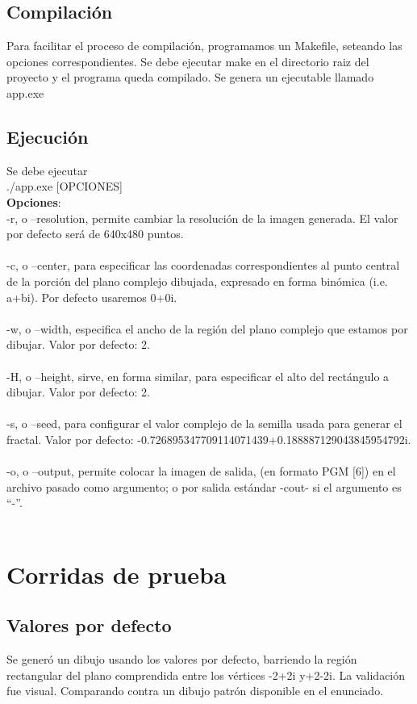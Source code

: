 \documentclass [12pt, a4paper]{article}
\begin{document}
	\subsection{Compilación}
	Para facilitar el proceso de compilación, programamos un Makefile, seteando las opciones correspondientes. Se debe ejecutar make en el directorio raiz del proyecto y el programa queda compilado. Se genera un ejecutable llamado app.exe
	\subsection{Ejecución}
	Se debe ejecutar\\
	./app.exe [OPCIONES]\\
	
	\textbf{Opciones}:\\
	-r, o --resolution, permite cambiar la resolución de la imagen generada. El valor por defecto será de 640x480 puntos.\\\\
	-c, o --center, para especificar las coordenadas correspondientes al punto central de la porción del plano complejo dibujada, expresado en forma binómica (i.e. a+bi). Por defecto usaremos 0+0i.\\\\
	-w, o --width, especifica el ancho de la región del plano complejo que estamos por dibujar. Valor por defecto: 2.\\\\
	-H, o --height, sirve, en forma similar, para especificar el alto del rectángulo a dibujar. Valor por defecto: 2.\\\\
	-s, o --seed, para configurar el valor complejo de la semilla usada para generar el fractal. Valor por defecto: -0.726895347709114071439+0.188887129043845954792i.\\\\
	-o, o --output, permite colocar la imagen de salida, (en formato PGM [6]) en el archivo pasado como argumento; o por salida estándar -cout- si el argumento es “-”.\\\\
	
	
	\section{Corridas de prueba}
	\subsection{Valores por defecto}
	Se generó un dibujo usando los valores por defecto, barriendo la región rectangular del plano comprendida entre los vértices -2+2i y+2-2i.	La validación fue visual. Comparando contra un dibujo patrón disponible en el enunciado.\\
\end{document}
